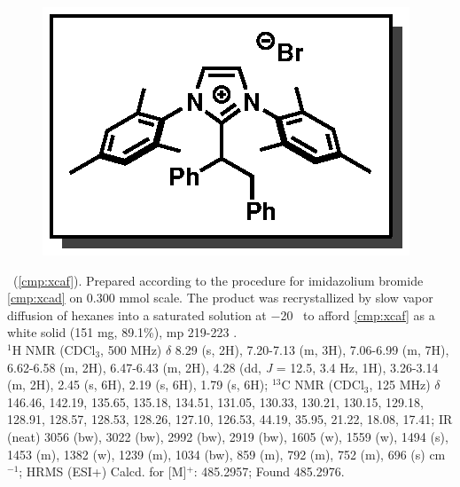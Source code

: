 \vspace{10pt}
\begin{figure}
  \vspace{-25pt}
  \begin{center}
    \includegraphics[scale=0.8]{chp_alkylation/images/xcaf}
  \end{center}
  \vspace{-30pt}
\end{figure}
\noindent \textbf{\CMPxcaf}\ (\ref{cmp:xcaf}). Prepared according to the procedure for imidazolium
bromide \ref{cmp:xcad} on 0.300 mmol scale. The product was recrystallized by slow vapor diffusion
of hexanes into a saturated  solution at $-$20 \degc\  to afford \ref{cmp:xcaf} as a white
solid (151 mg, 89.1\%), mp 219-223 \degc.
\\
$^1$H NMR (CDCl$_3$, 500 MHz) $\delta$ 8.29 (s, 2H), 7.20-7.13 (m, 3H), 7.06-6.99 (m, 7H),
6.62-6.58 (m, 2H), 6.47-6.43 (m, 2H), 4.28 (dd, \textit{J} = 12.5, 3.4 Hz, 1H), 3.26-3.14 (m, 2H),
2.45 (s, 6H), 2.19 (s, 6H), 1.79 (s, 6H); $^{13}$C NMR (CDCl$_3$, 125 MHz) $\delta$ 146.46, 142.19, 135.65, 135.18, 134.51,
131.05, 130.33, 130.21, 130.15, 129.18, 128.91, 128.57, 128.53, 128.26, 127.10, 126.53, 44.19, 35.95, 21.22, 18.08, 17.41; IR (neat) 3056 (bw), 3022 (bw), 2992 (bw), 2919 (bw), 1605 (w), 1559 (w), 1494 (s),
1453 (m), 1382 (w), 1239 (m), 1034 (bw), 859 (m), 792 (m), 752 (m), 696 (s) cm$^{-1}$; HRMS (ESI+)
Calcd.
for  [M]$^+$:
485.2957; Found 485.2976.

